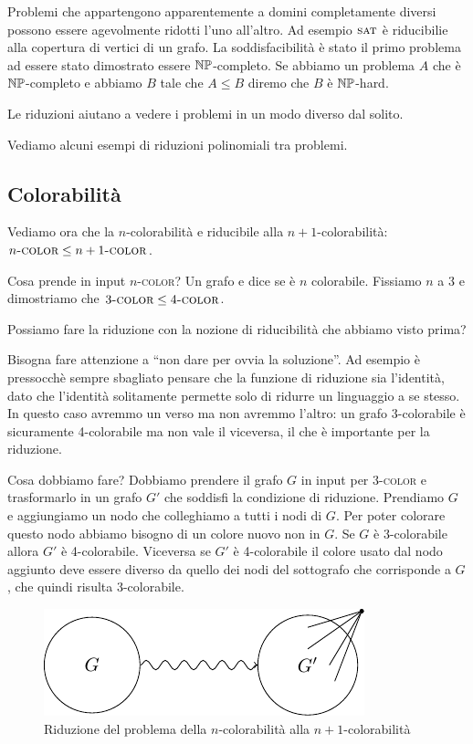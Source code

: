 Problemi che appartengono apparentemente a domini completamente diversi possono essere agevolmente
ridotti l'uno all'altro. Ad esempio $\textsc{sat}$ è riducibilie alla copertura di vertici di un grafo. La
soddisfacibilità è stato il primo problema ad essere stato dimostrato essere $\mathbb{NP}$-completo. Se
abbiamo un problema $A$ che è $\mathbb{NP}$-completo e abbiamo $B$ tale che $A \leq B$ diremo che $B$
è $\mathbb{NP}$-hard.

Le riduzioni aiutano a vedere i problemi in un modo diverso dal solito.

Vediamo alcuni esempi di riduzioni polinomiali tra problemi.

\subsection{Colorabilità}

Vediamo ora che la $n$-colorabilità e riducibile alla $n+1$-colorabilità: $n\textsc{-color} \leq
n+1\textsc{-color}$.

Cosa prende in input $n$\textsc{-color}? Un grafo e dice se è $n$ colorabile. Fissiamo $n$ a 3 e dimostriamo
che $3\textsc{-color} \leq 4\textsc{-color}$.

Possiamo fare la riduzione con la nozione di riducibilità che abbiamo visto prima?

Bisogna fare attenzione a ``non dare per ovvia la soluzione''. Ad esempio è pressocchè sempre
sbagliato pensare che la funzione di riduzione sia l'identità, dato che l'identità solitamente
permette solo di ridurre un linguaggio a se stesso. In questo caso avremmo un verso ma non avremmo
l'altro: un grafo 3-colorabile è sicuramente 4-colorabile ma non vale il viceversa, il che è
importante per la riduzione.

Cosa dobbiamo fare? Dobbiamo prendere il grafo $G$ in input per 3\textsc{-color} e trasformarlo in
un grafo $G'$ che soddisfi la condizione di riduzione. Prendiamo $G$ e aggiungiamo un nodo che
colleghiamo a tutti i nodi di $G$. Per poter colorare questo nodo abbiamo bisogno di un colore nuovo
non in $G$.  Se $G$ è 3-colorabile allora $G'$ è 4-colorabile. Viceversa se $G'$ è 4-colorabile
il colore usato dal nodo aggiunto deve essere diverso da quello dei nodi del sottografo che
corrisponde a $G$, che quindi risulta 3-colorabile.

\begin{figure}[h]
    \begin{center}
        \includegraphics{./img/complexity_intro/3COL4COL.pdf}
    \end{center}
    \caption{Riduzione del problema della $n$-colorabilità alla $n+1$-colorabilità}
\end{figure}


